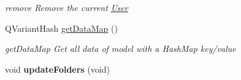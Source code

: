 \begin{DoxyCompactItemize}
\begin{DoxyCompactList}\small\item\em remove Remove the current \hyperlink{classModels_1_1User}{User} \end{DoxyCompactList}\item 
Q\-Variant\-Hash \hyperlink{classModels_1_1User_abbc8a3a40b527497872240bf39f21314}{get\-Data\-Map} ()
\begin{DoxyCompactList}\small\item\em get\-Data\-Map Get all data of model with a Hash\-Map key/value \end{DoxyCompactList}\item 
\hypertarget{classModels_1_1User_ae61c862ac430d25b538601f343f7bf98}{void {\bfseries update\-Folders} (void)}\label{classModels_1_1User_ae61c862ac430d25b538601f343f7bf98}


\end{DoxyCompactItemize}
